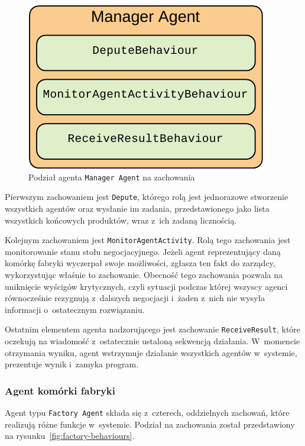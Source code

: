 \begin{figure}[h]
    \centering
    \includegraphics[width=0.8\columnwidth]{figures/SAG-Manager-Behaviours.pdf}
    \caption{Podział agenta \texttt{Manager Agent} na zachowania}
    \label{fig:manager-behaviours}
\end{figure}

Pierwszym zachowaniem jest \texttt{Depute}, którego rolą jest jednorazowe stworzenie wszystkich agentów oraz wysłanie im zadania, przedstawionego jako lista wszystkich końcowych produktów, wraz z~ich zadaną licznością.

Kolejnym zachowaniem jest \texttt{MonitorAgentActivity}. Rolą tego zachowania jest monitorowanie stanu stołu negocjacyjnego. Jeżeli agent reprezentujący daną komórkę fabryki wyczerpał swoje możliwości, zgłasza ten fakt do zarządcy, wykorzystując właśnie to zachowanie. Obecność tego zachowania pozwala na uniknięcie wyścigów krytycznych, czyli sytuacji podczas której wszyscy agenci równocześnie rezygnują z~dalszych negocjacji i~żaden z~nich nie wysyła informacji o~ostatecznym rozwiązaniu.

Ostatnim elementem agenta nadzorującego jest zachowanie \texttt{ReceiveResult}, które oczekują na wiadomość z~ostatecznie ustaloną sekwencją działania. W~momencie otrzymania wyniku, agent wstrzymuje działanie wszystkich agentów w~systemie, prezentuje wynik i~zamyka program. 

\subsubsection{Agent komórki fabryki}
Agent typu \texttt{Factory Agent} składa się z~czterech, oddzielnych zachowań, które realizują różne funkcje w~systemie. Podział na zachowania został przedstawiony na rysunku~\ref{fig:factory-behaviours}.

